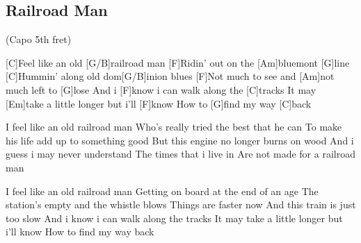 \subsection*{Railroad Man   }
\begin{guitar}
(Capo 5th fret)


[C]Feel like an old [G/B]railroad man
[F]Ridin' out on the [Am]bluemont [G]line
[C]Hummin' along old dom[G/B]inion blues
[F]Not much to see and [Am]not much left to [G]lose
And i [F]know i can walk along the [C]tracks
It may [Em]take a little longer but i'll [F]know
How to [G]find my way [C]back

I feel like an old railroad man
Who's really tried the best that he can
To make his life add up to something good
But this engine no longer burns on wood
And i guess i may never understand
The times that i live in
Are not made for a railroad man

I feel like an old railroad man
Getting on board at the end of an age
The station's empty and the whistle blows
Things are faster now
And this train is just too slow
And i know i can walk along the tracks
It may take a little longer but i'll know
How to find my way back 
\end{guitar}
